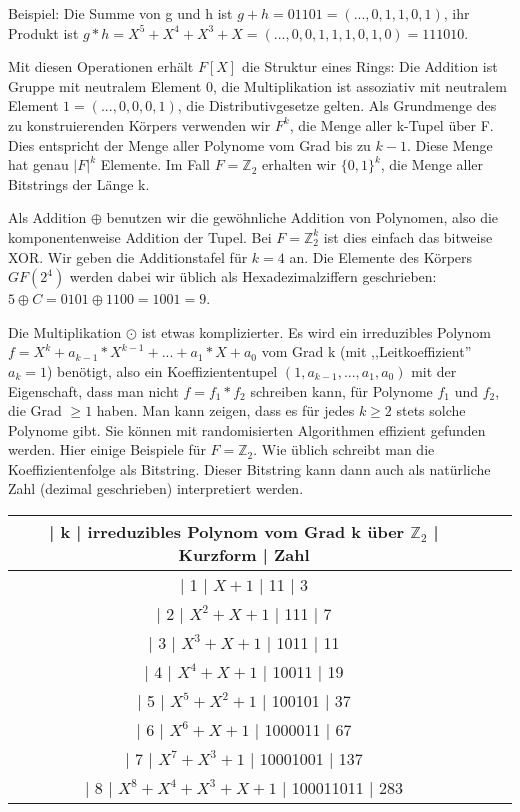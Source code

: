 \documentclass[a4paper]{article}
\begin{document}
\begin{multicols}{3}
    Beispiel: Die Summe von g und h ist $g+h=01101=(...,0,1,1,0,1)$, ihr Produkt ist $g*h=X^5+X^4+X^3+X=(...,0,0,1,1,1,0,1,0)=111010$.

    Mit diesen Operationen erhält $F[X]$ die Struktur eines Rings: Die Addition ist Gruppe mit neutralem Element 0, die Multiplikation ist assoziativ mit neutralem Element $1=(...,0,0,0,1)$, die Distributivgesetze gelten.
    Als Grundmenge des zu konstruierenden Körpers verwenden wir $F^k$, die Menge aller k-Tupel über F. Dies entspricht der Menge aller Polynome vom Grad bis zu $k-1$. Diese Menge hat genau $|F|^k$ Elemente. Im Fall $F=\mathbb{Z}_2$ erhalten wir $\{0,1\}^k$, die Menge aller Bitstrings der Länge k.

    Als Addition $\oplus$ benutzen wir die gewöhnliche Addition von Polynomen, also die komponentenweise Addition der Tupel. Bei $F=\mathbb{Z}^k_2$ ist dies einfach das bitweise XOR. Wir geben die Additionstafel für $k=4$ an. Die Elemente des Körpers $GF(2^4)$ werden dabei wir üblich als Hexadezimalziffern geschrieben: $5\oplus C=0101\oplus 1100=1001=9$.

    Die Multiplikation $\odot$ ist etwas komplizierter. Es wird ein irreduzibles Polynom $f=X^k+a_{k-1}* X^{k-1}+...+a_1*X+a_0$ vom Grad k (mit ,,Leitkoeffizient'' $a_k=1$) benötigt, also ein Koeffiziententupel $(1,a_{k-1},...,a_1,a_0)$ mit der Eigenschaft, dass man nicht $f=f_1*f_2$ schreiben kann, für Polynome $f_1$ und $f_2$, die Grad $\geq 1$ haben. Man kann zeigen, dass es für jedes $k\geq 2$ stets solche Polynome gibt. Sie können mit randomisierten Algorithmen effizient gefunden werden. Hier einige Beispiele für $F=\mathbb{Z}_2$. Wie üblich schreibt man die Koeffizientenfolge als Bitstring. Dieser Bitstring kann dann auch als natürliche Zahl (dezimal geschrieben) interpretiert werden.

    \begin{tabular}{c|c|c}
        | k  | irreduzibles Polynom vom Grad k über $\mathbb{Z}_2$ | Kurzform | Zahl \\\hline
        | 1  | $X+ 1$                       | 11    | 3                              \\
        | 2  | $X^2 +X+ 1$                     | 111    | 7                          \\
        | 3  | $X^3 +X+ 1$                     | 1011   | 11                         \\
        | 4  | $X^4 +X+ 1$                     | 10011   | 19                        \\
        | 5  | $X^5 +X^2 + 1$                   | 100101  | 37                       \\
        | 6  | $X^6 +X+ 1$                     | 1000011  | 67                       \\
        | 7  | $X^7 +X^3 + 1$                   | 10001001 | 137                     \\
        | 8  | $X^8 +X^4 +X^3 +X+ 1$                | 100011011 | 283
    \end{tabular}


\end{multicols}
\end{document}
